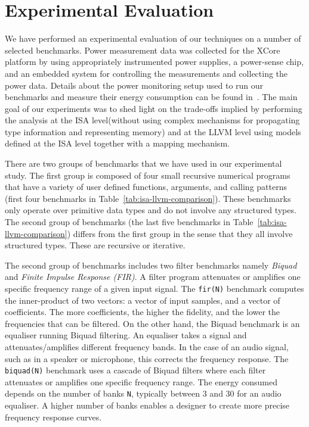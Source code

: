 \documentclass{llncs}
\newcommand{\level}{level\xspace}
\newcommand{\llvm}{LLVM\xspace}
\begin{document}
\section{Experimental Evaluation}
\label{sec:experiments}

We have performed an experimental evaluation of our techniques on a
number of selected benchmarks. Power measurement data was collected
for the XCore platform by using appropriately instrumented power
supplies, a power-sense chip, and an embedded system for controlling
the measurements and collecting the power data.  
Details about the power monitoring setup used to run our benchmarks
and measure their energy consumption can be found in~\cite{Kerrison13}. 
The main goal of our
experiments was to shed light on the trade-offs implied by performing
the analysis at the ISA \level (without using complex mechanisms for
propagating type information and representing memory) and at the \llvm
level using models defined at the ISA \level together with a mapping
mechanism.

There are two groups of benchmarks that we have used in our
experimental study.
The first group is composed of four small recursive numerical programs
that
have a variety of user defined functions, arguments, and calling
patterns (first four benchmarks in Table~\ref{tab:isa-llvm-comparison}). These benchmarks only operate over primitive data types and
do not involve any structured types.
The second group of benchmarks (the last five benchmarks in
Table~\ref{tab:isa-llvm-comparison}) differs from the first group in
the sense that they all involve structured types. These are recursive
or iterative.

The second group of benchmarks includes two filter benchmarks namely
\textit{Biquad} and \textit{Finite Impulse Response (FIR)}. A filter
program attenuates or amplifies one specific frequency range of a
given input signal.  The \texttt{fir(N)} benchmark computes the
inner-product of two vectors: a vector of input samples, and a vector
of coefficients. The more coefficients, the higher the fidelity, and
the lower the frequencies that can be filtered. On the other hand, the
Biquad benchmark is an equaliser running Biquad filtering. An
equaliser takes a signal and attenuates/amplifies different frequency
bands. In the case of an audio signal, such as in a speaker or
microphone, this corrects the frequency response. The
\texttt{biquad(N)} benchmark uses a cascade of Biquad filters where
each filter attenuates or amplifies one specific frequency range.  The
energy consumed depends on the number of banks \texttt{N}, typically
between 3 and 30 for an audio equaliser. A higher number of banks
enables a designer to create more precise frequency response curves.
\end{document}
